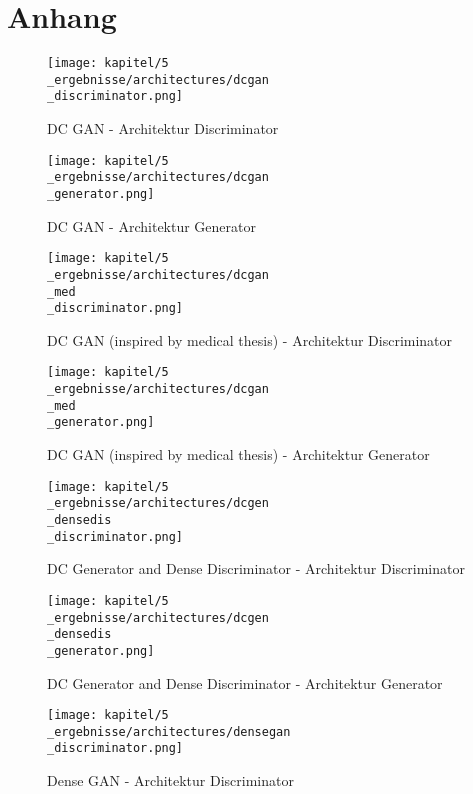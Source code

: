 \chapter{Anhang}

\begin{figure}[H]
	\centering
	\texttt{[image: kapitel/5\\\_ergebnisse/architectures/dcgan\\\_discriminator.png]}
	\caption{DC GAN - Architektur Discriminator}
	\label{architecture:dcgan-dis}
\end{figure}

\begin{figure}[H]
	\centering
	\texttt{[image: kapitel/5\\\_ergebnisse/architectures/dcgan\\\_generator.png]}
	\caption{DC GAN - Architektur Generator}
	\label{architecture:dcgan-gen}
\end{figure}

\begin{figure}[H]
	\centering
	\texttt{[image: kapitel/5\\\_ergebnisse/architectures/dcgan\\\_med\\\_discriminator.png]}
	\caption{DC GAN (inspired by medical thesis) - Architektur Discriminator}
	\label{architecture:dcgan-med-dis}
\end{figure}

\begin{figure}[H]
	\centering
	\texttt{[image: kapitel/5\\\_ergebnisse/architectures/dcgan\\\_med\\\_generator.png]}
	\caption{DC GAN (inspired by medical thesis) - Architektur Generator}
	\label{architecture:dcgan-med-gen}
\end{figure}

\begin{figure}[H]
	\centering
	\texttt{[image: kapitel/5\\\_ergebnisse/architectures/dcgen\\\_densedis\\\_discriminator.png]}
	\caption{DC Generator and Dense Discriminator - Architektur Discriminator}
	\label{architecture:dcgen-densedis-dis}
\end{figure}

\begin{figure}[H]
	\centering
	\texttt{[image: kapitel/5\\\_ergebnisse/architectures/dcgen\\\_densedis\\\_generator.png]}
	\caption{DC Generator and Dense Discriminator - Architektur Generator}
	\label{architecture:dcgen-densedis-gen}
\end{figure}

\begin{figure}[H]
	\centering
	\texttt{[image: kapitel/5\\\_ergebnisse/architectures/densegan\\\_discriminator.png]}
	\caption{Dense GAN - Architektur Discriminator}
	\label{architecture:densegan-dis}
\end{figure}

